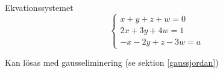 \documentclass[../../main.tex]{subfiles}
\begin{document}
\begin{solution}{15}

Ekvationssystemet 
$$
\begin{cases}
x + y + z + w = 0\\
2x + 3y + 4w = 1\\
-x -2y + z - 3w = a
\end{cases}
$$

Kan lösas med gausseliminering (se sektion \ref{gaussjordan})



\end{solution}
\end{document}
